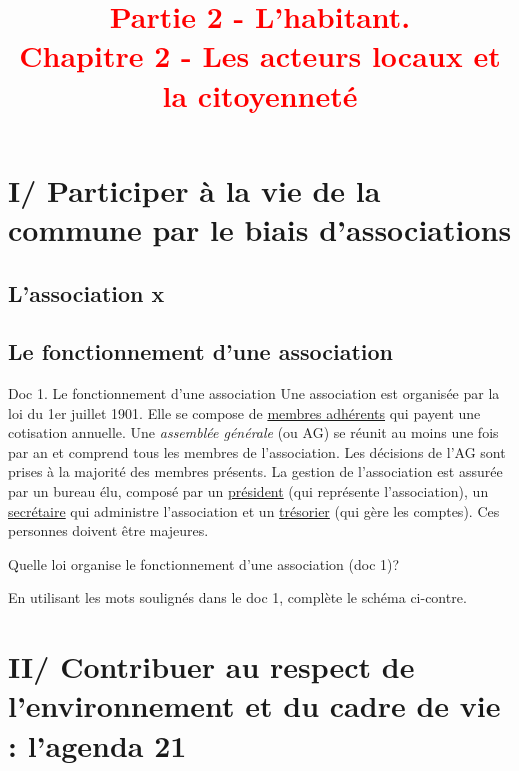 \documentclass{beamer}
\title{{\textcolor{red}{Partie 2 - L'habitant.
      \\Chapitre 2 - Les acteurs locaux et la citoyenneté }}}
\begin{document}
 
\begin{frame}
\titlepage %
\end{frame}

\begin{frame}
\tableofcontents
\end{frame}

\section{I/ Participer à la vie de la commune par le biais d'associations}
\subsection{L'association x}

\subsection{Le fonctionnement d'une association}
\begin{frame}
\begin{beamerboxesrounded}[scheme=blocimage]{Doc 1. Le fonctionnement d'une association} 
Une association est organisée par la loi du 1er juillet 1901. Elle se compose de \underline{membres adhérents} qui payent une cotisation annuelle. Une \textit{assemblée générale} (ou AG) se réunit au moins une fois par an et comprend tous les membres de l'association. Les décisions de l'AG sont prises à la majorité des membres présents. La gestion de l'association est assurée par un bureau élu, composé par un \underline{président} (qui représente l'association), un \underline{secrétaire} qui administre l'association et un \underline{trésorier} (qui gère les comptes). Ces personnes doivent être majeures.
\end{beamerboxesrounded}
\end{frame}

\begin{frame}
Quelle loi organise le fonctionnement d'une association (doc 1)?

En utilisant les mots soulignés dans le doc 1, complète le schéma ci-contre.

\end{frame}

\section{II/ Contribuer au respect de l'environnement et du cadre de vie : l'agenda 21}

  
\end{document}

